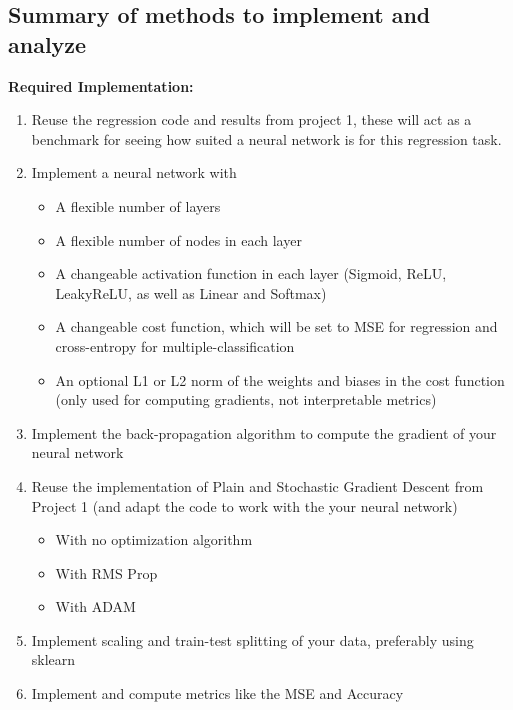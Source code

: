 \documentclass[%
oneside,                 %
final,                   %
10pt]{article}
\begin{document}
\subsection*{Summary of methods to implement and analyze}

\textbf{Required Implementation:}
\begin{enumerate}
\item Reuse the regression code and results from project 1, these will act as a benchmark for seeing how suited a neural network is for this regression task.

\item Implement a neural network with
\begin{itemize}

  \item A flexible number of layers

  \item A flexible number of nodes in each layer

  \item A changeable activation function in each layer (Sigmoid, ReLU, LeakyReLU, as well as Linear and Softmax)

  \item A changeable cost function, which will be set to MSE for regression and cross-entropy for multiple-classification

  \item An optional L1 or L2 norm of the weights and biases in the cost function (only used for computing gradients, not interpretable metrics)

\end{itemize}

\noindent
\item Implement the back-propagation algorithm to compute the gradient of your neural network

\item Reuse the implementation of Plain and Stochastic Gradient Descent from Project 1 (and adapt the code to work with the your neural network)
\begin{itemize}

  \item With no optimization algorithm

  \item With RMS Prop

  \item With ADAM

\end{itemize}

\noindent
\item Implement scaling and train-test splitting of your data, preferably using sklearn

\item Implement and compute metrics like the MSE and Accuracy
\end{enumerate}
\end{document}
